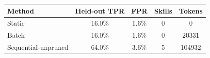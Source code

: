 \begin{tabular}{lcccc}
\toprule
Method & Held-out TPR & FPR & Skills & Tokens \\
\midrule
Static & 16.0\% & 1.6\% & 0 & 0 \\
Batch & 16.0\% & 1.6\% & 0 & 20331 \\
Sequential-unpruned & 64.0\% & 3.6\% & 5 & 104932 \\
\bottomrule
\end{tabular}

